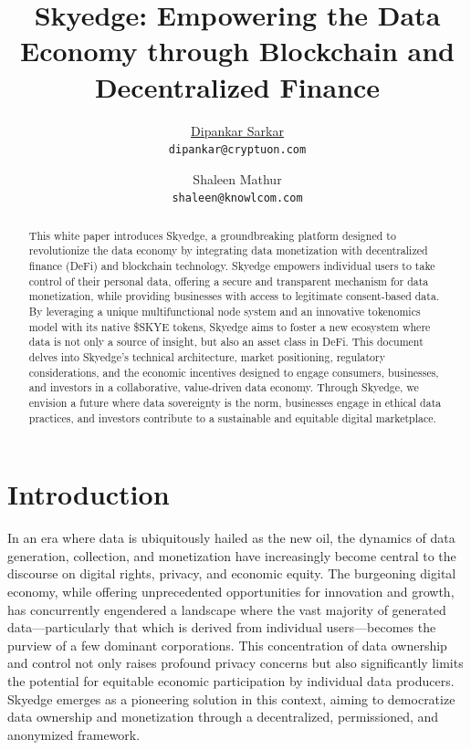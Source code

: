 \documentclass{article}
\title{Skyedge: Empowering the Data Economy through Blockchain and Decentralized Finance}
\author{\href{https://www.dipankar.name}{\hspace{1mm}Dipankar Sarkar} \\
  \texttt{dipankar@cryptuon.com} \\
        \and
	Shaleen Mathur \\
	\texttt{shaleen@knowlcom.com} \\
 }
\begin{document}
\maketitle

\begin{abstract}
This white paper introduces Skyedge, a groundbreaking platform designed to revolutionize the data economy by integrating data monetization with decentralized finance (DeFi) and blockchain technology. Skyedge empowers individual users to take control of their personal data, offering a secure and transparent mechanism for data monetization, while providing businesses with access to legitimate consent-based data. By leveraging a unique multifunctional node system and an innovative tokenomics model with its native \$SKYE tokens, Skyedge aims to foster a new ecosystem where data is not only a source of insight, but also an asset class in DeFi. This document delves into Skyedge's technical architecture, market positioning, regulatory considerations, and the economic incentives designed to engage consumers, businesses, and investors in a collaborative, value-driven data economy. Through Skyedge, we envision a future where data sovereignty is the norm, businesses engage in ethical data practices, and investors contribute to a sustainable and equitable digital marketplace.
\end{abstract}

\pagebreak

\tableofcontents

\pagebreak

\section{Introduction}
In an era where data is ubiquitously hailed as the new oil, the dynamics of data generation, collection, and monetization have increasingly become central to the discourse on digital rights, privacy, and economic equity. The burgeoning digital economy, while offering unprecedented opportunities for innovation and growth, has concurrently engendered a landscape where the vast majority of generated data—particularly that which is derived from individual users—becomes the purview of a few dominant corporations. This concentration of data ownership and control not only raises profound privacy concerns but also significantly limits the potential for equitable economic participation by individual data producers. Skyedge emerges as a pioneering solution in this context, aiming to democratize data ownership and monetization through a decentralized, permissioned, and anonymized framework.
\end{document}
